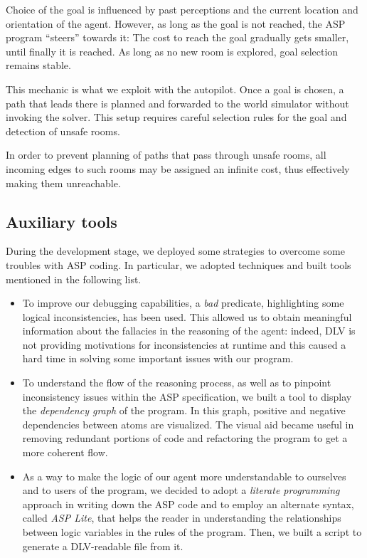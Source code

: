 \documentclass{llncs}
\begin{document}
Choice of the goal is influenced by past perceptions and the current location and orientation of the agent. However, as long as the goal is not reached, the ASP program \enquote{steers} towards it: The cost to reach the goal gradually gets smaller, until finally it is reached. As long as no new room is explored, goal selection remains stable.

This mechanic is what we exploit with the autopilot. Once a goal is chosen, a path that leads there is planned and forwarded to the world simulator without invoking the solver. This setup requires careful selection rules for the goal and detection of unsafe rooms.

In order to prevent planning of paths that pass through unsafe rooms, all incoming edges to such rooms may be assigned an infinite cost, thus effectively making them unreachable.


\subsection{Auxiliary tools}

During the development stage, we deployed some strategies to overcome some troubles with ASP coding. In particular, we adopted techniques and built tools mentioned in the following list.

\begin{itemize}
	\item To improve our debugging capabilities, a \emph{bad} predicate, highlighting some logical inconsistencies, has been used.
	This allowed us to obtain meaningful information about the fallacies in the reasoning of the agent: indeed, DLV is not providing motivations for inconsistencies at runtime and this caused a hard time in solving some important issues with our program.
	\item To understand the flow of the reasoning process, as well as to pinpoint inconsistency issues within the ASP specification, we built a tool to display the \emph{dependency graph} of the program.
	In this graph, positive and negative dependencies between atoms are visualized.
	The visual aid became useful in removing redundant portions of code and refactoring the program to get a more coherent flow.
	\item As a way to make the logic of our agent more understandable to ourselves and to users of the program, we decided to adopt a \emph{literate programming} approach in writing down the ASP code and to employ an alternate syntax, called \emph{ASP Lite}, that helps the reader in understanding the relationships between logic variables in the rules of the program.
	Then, we built a script to generate a DLV-readable file from it.
\end{itemize}
\end{document}
